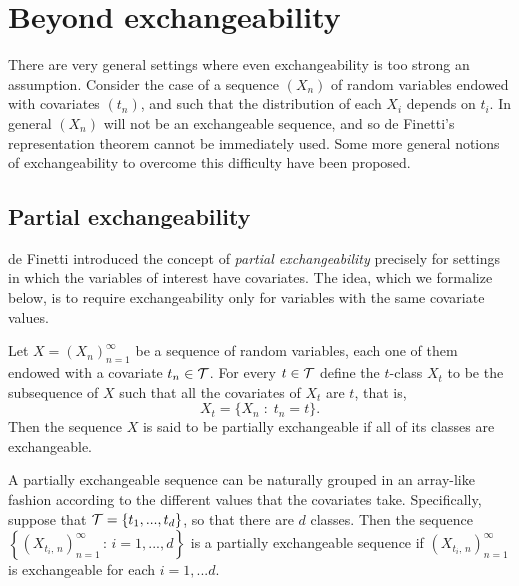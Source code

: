 

\section{Beyond exchangeability} \label{section:exchangeability}




There are very general settings where even exchangeability is too strong an assumption. Consider the case of a sequence $(X_n)$ of random variables endowed with covariates $(t_n)$, and such that the distribution of each $X_i$ depends on $t_i$. In general $(X_n)$ will not be an exchangeable sequence, and so de Finetti's representation theorem cannot be immediately used. Some more general notions of exchangeability to overcome this difficulty have been proposed.



\subsection{Partial exchangeability}


de Finetti \cite{deFinetti:1938:partial_exch} introduced the concept of \textit{partial exchangeability} precisely for settings in which the variables of interest have covariates. The idea, which we formalize below, is to require exchangeability only for variables with the same covariate values.

\begin{definition} \label{def:partial_exchangeability}
	Let $X = (X_n)_{n=1}^{\infty}$ be a sequence of random variables, each one of them endowed with a covariate $t_n \in \mathcal{T}$. For every $t \in \mathcal{T}$ define the $t$-class $X_t$ to be the subsequence of $X$ such that all the covariates of $X_t$ are $t$, that is,
	\begin{equation*}
		X_t = \{ X_n \; : \; t_n = t \}.
	\end{equation*}
	Then the sequence $X$ is said to be partially exchangeable if all of its classes are exchangeable.
\end{definition}

A partially exchangeable sequence can be naturally grouped in an array-like fashion according to the different values that the covariates take. Specifically, suppose that $\mathcal{T} = \{t_1, ..., t_d \}$, so that there are $d$ classes. Then the sequence $\left\{ (X_{t_i, \, n})_{n=1}^{\infty} \, : \, i=1, ..., d \right\}$ is a partially exchangeable sequence if $(X_{t_i, \, n})_{n=1}^{\infty}$ is exchangeable for each $i=1, ...d$. \\

